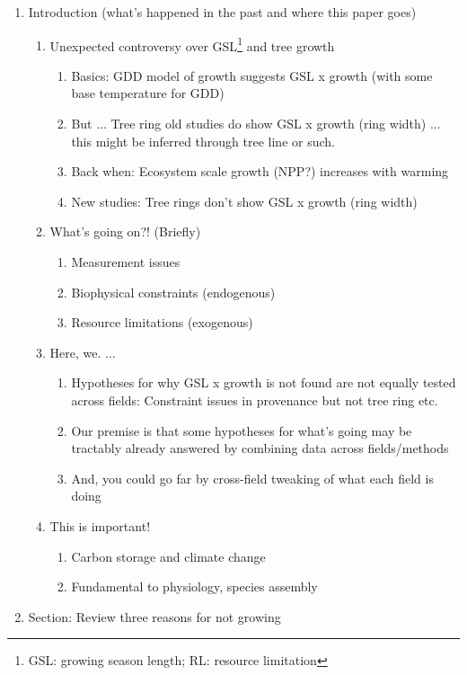 \documentclass[11pt,letter]{article}
\begin{document}
\begin{enumerate}
\item Introduction (what's happened in the past and where this paper goes)
\begin{enumerate}
\item Unexpected controversy over GSL\footnote{GSL: growing season length;  RL: resource limitation} and tree growth 
\begin{enumerate}
\item Basics: GDD model of growth suggests GSL x growth (with some base temperature for GDD)
\item But ... Tree ring old studies do show GSL x growth (ring width)  ... this might be inferred through tree line or such.
\item Back when: Ecosystem scale growth (NPP?) increases with warming
\item New studies: Tree rings don't show GSL x growth (ring width)
\end{enumerate}
\item What's going on?! (Briefly)
\begin{enumerate}
\item Measurement issues 
\item Biophysical constraints (endogenous)
\item Resource limitations (exogenous) 
\end{enumerate}
\item Here, we. ...
\begin{enumerate}
\item Hypotheses for why GSL x growth is not found are not equally tested across fields: Constraint issues in provenance but not tree ring etc.
\item Our premise is that some hypotheses for what's going may be tractably already answered by combining data across fields/methods
\item And, you could go far by cross-field tweaking of what each field is doing
\end{enumerate}
\item This is important! 
\begin{enumerate}
\item Carbon storage and climate change
\item Fundamental to physiology, species assembly
\end{enumerate}
\end{enumerate}
\item Section: Review three reasons for not growing 

\end{enumerate}
\end{document}
